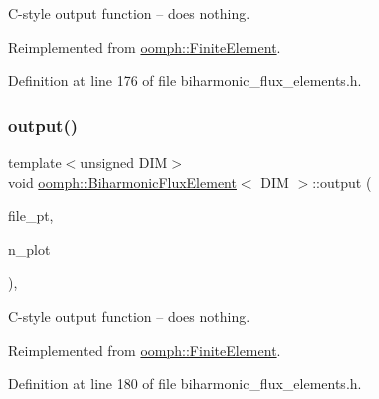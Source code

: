 C-\/style output function -- does nothing. 



Reimplemented from \hyperlink{classoomph_1_1FiniteElement_a72cddd09f8ddbee1a20a1ff404c6943e}{oomph\+::\+Finite\+Element}.



Definition at line 176 of file biharmonic\+\_\+flux\+\_\+elements.\+h.

\mbox{\label{classoomph_1_1BiharmonicFluxElement_ad5e4addb8deb7cf8df09e7f9ea23e155}} 
\subsubsection{\texorpdfstring{output()}{output()}\hspace{0.1cm}{\footnotesize\ttfamily [4/4]}}
{\footnotesize\ttfamily template$<$unsigned D\+IM$>$ \\
void \hyperlink{classoomph_1_1BiharmonicFluxElement}{oomph\+::\+Biharmonic\+Flux\+Element}$<$ D\+IM $>$\+::output (\begin{DoxyParamCaption}\item[{F\+I\+LE $\ast$}]{file\+\_\+pt,  }\item[{const unsigned \&}]{n\+\_\+plot }\end{DoxyParamCaption})\hspace{0.3cm}{\ttfamily [inline]}, {\ttfamily [virtual]}}



C-\/style output function -- does nothing. 



Reimplemented from \hyperlink{classoomph_1_1FiniteElement_adfaee690bb0608f03320eeb9d110d48c}{oomph\+::\+Finite\+Element}.



Definition at line 180 of file biharmonic\+\_\+flux\+\_\+elements.\+h.

\mbox{\label{classoomph_1_1BiharmonicFluxElement_af8520446e8c6194b43081bbb5e479bdd}} 
